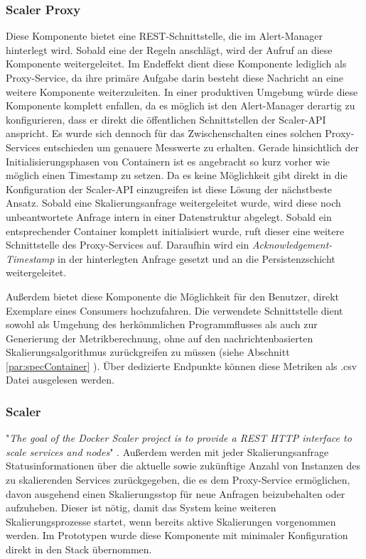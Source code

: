 \subsubsection{Scaler Proxy}
Diese Komponente bietet eine REST-Schnittstelle, die im Alert-Manager hinterlegt wird. Sobald eine der Regeln anschlägt, wird der Aufruf an diese Komponente weitergeleitet. Im Endeffekt dient diese Komponente lediglich als Proxy-Service, da ihre primäre Aufgabe darin besteht diese Nachricht an eine weitere Komponente weiterzuleiten. In einer produktiven Umgebung würde diese Komponente komplett enfallen, da es möglich ist den Alert-Manager derartig zu konfigurieren, dass er direkt die öffentlichen Schnittstellen der Scaler-API anspricht. Es wurde sich dennoch für das Zwischenschalten eines solchen Proxy-Services entschieden um genauere Messwerte zu erhalten. Gerade hinsichtlich der Initialisierungsphasen von Containern ist es angebracht so kurz vorher wie möglich einen Timestamp zu setzen. Da es keine Möglichkeit gibt direkt in die Konfiguration der Scaler-API einzugreifen ist diese Lösung der nächstbeste Ansatz. Sobald eine Skalierungsanfrage weitergeleitet wurde, wird diese noch unbeantwortete Anfrage intern in einer Datenstruktur abgelegt. Sobald ein entsprechender Container komplett initialisiert wurde, ruft dieser eine weitere Schnittstelle des Proxy-Services auf. Daraufhin wird ein \emph{Acknowledgement-Timestamp} in der hinterlegten Anfrage gesetzt und an die Persistenzschicht weitergeleitet. 

Außerdem bietet diese Komponente die Möglichkeit für den Benutzer, direkt Exemplare eines Consumers hochzufahren. Die verwendete Schnittstelle dient sowohl als Umgehung des herkömmlichen Programmflusses als auch zur Generierung der Metrikberechnung, ohne auf den nachrichtenbasierten Skalierungsalgorithmus zurückgreifen zu müssen (siehe Abschnitt \ref{par:specContainer} ). Über dedizierte Endpunkte können diese Metriken als .csv Datei ausgelesen werden. 


\subsubsection{Scaler}
"\emph{The goal of the Docker Scaler project is to provide a REST HTTP interface to scale services and nodes}" \cite{docker-scaler}. Außerdem werden mit jeder Skalierungsanfrage Statusinformationen über die aktuelle sowie zukünftige Anzahl von Instanzen des zu skalierenden Services zurückgegeben, die es dem Proxy-Service ermöglichen, davon ausgehend einen Skalierungsstop für neue Anfragen beizubehalten oder aufzuheben. Dieser ist nötig, damit das System keine weiteren Skalierungsprozesse startet, wenn bereits aktive Skalierungen vorgenommen werden. Im Prototypen wurde diese Komponente mit minimaler Konfiguration direkt in den Stack übernommen.


